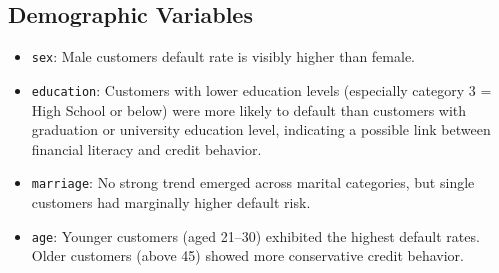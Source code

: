 \documentclass[12pt,a4paper]{article}
\begin{document}
\subsection{Demographic Variables}
\begin{itemize}
    \item \texttt{sex}: Male customers default rate is visibly higher than female.
    \item \texttt{education}: Customers with lower education levels (especially category 3 = High School or below) were more likely to default than customers with graduation or university education level, indicating a possible link between financial literacy and credit behavior.
    \item \texttt{marriage}: No strong trend emerged across marital categories, but single customers had marginally higher default risk.
    \item \texttt{age}: Younger customers (aged 21--30) exhibited the highest default rates. Older customers (above 45) showed more conservative credit behavior.
\end{itemize}
\end{document}
